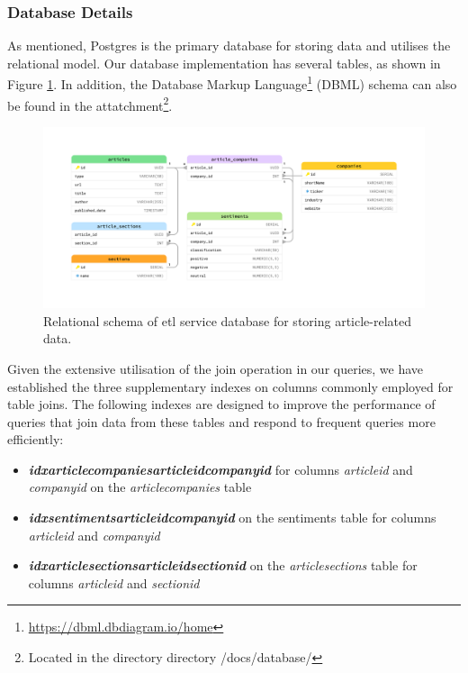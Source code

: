 \subsubsection{Database Details}
\label{subsubsec:architecture-etl-database-details}
As mentioned, Postgres is the primary database for storing data and utilises the relational model. Our database implementation has several tables, as shown in Figure \ref{fig:architecture-etl-database-schema}. In addition, the Database Markup Language\footnote{\href{https://dbml.dbdiagram.io/home}{https://dbml.dbdiagram.io/home}} (DBML) schema can also be found in the attatchment\footnote{Located in the directory directory /docs/database/}.

\begin{figure}[htbp]
    \centering
    \includegraphics[width=\textwidth]{img/architecture/database-schema.pdf}
    \caption{Relational schema of \acrshort{etl} service database for storing article-related data.}
    \label{fig:architecture-etl-database-schema}
\end{figure}

Given the extensive utilisation of the join operation in our queries, we have established the three supplementary indexes on columns commonly employed for table joins. The following indexes are designed to improve the performance of queries that join data from these tables and respond to frequent queries more efficiently:

\begin{itemize}
    \item \textbf{\textit{idx\textunderscore article\textunderscore companies\textunderscore article\textunderscore id\textunderscore company\textunderscore id}} for columns \textit{article\textunderscore id} and \textit{company\textunderscore id} on the \textit{article\textunderscore companies} table
    \item \textbf{\textit{idx\textunderscore sentiments\textunderscore article\textunderscore id\textunderscore company\textunderscore id}} on the sentiments table for columns \textit{article\textunderscore id} and \textit{company\textunderscore id}
    \item \textbf{\textit{idx\textunderscore article\textunderscore sections\textunderscore article\textunderscore id\textunderscore section\textunderscore id}} on the \textit{article\textunderscore sections} table for columns \textit{article\textunderscore id} and \textit{section\textunderscore id}
\end{itemize}

